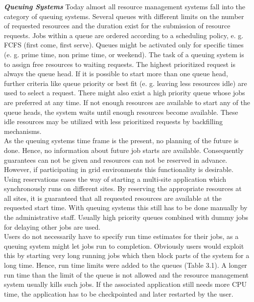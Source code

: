 \textbf{\textit{Queuing Systems }}Today almost all resource management systems fall into the category of queuing systems. Several queues with different limits on the number of requested resources and the duration exist for the submission of resource requests. Jobs within a queue are ordered according to a scheduling policy, e. g. FCFS (first come, first serve). Queues might be activated only for specific times (e. g. prime time, non prime time, or weekend). The task of a queuing system is to assign free resources to waiting requests. The highest prioritized request is always the queue head. If it is possible to start more than one queue head, further criteria like queue priority or best fit (e. g. leaving less resources idle) are used to select a request. There might also exist a high priority queue whose jobs are preferred at any time. If not enough resources are available to start any of the queue heads, the system waits until enough resources become available. These idle resources may be utilized with less prioritized requests by backfilling mechanisms.\\

As the queuing systems time frame is the present, no planning of the future is done. Hence, no information about future job starts are available. Consequently guarantees can not be given and resources can not be reserved in advance. However, if participating in grid environments this functionality is desirable. Using reservations eases the way of starting a multi-site application which synchronously runs on different sites. By reserving the appropriate resources at all sites, it is guaranteed that all requested resources are available at the requested start time. With queuing systems this still has to be done manually by the administrative staff. Usually high priority queues combined with dummy jobs for delaying other jobs are used.\\

Users do not necessarily have to specify run time estimates for their jobs, as a queuing system might let jobs run to completion. Obviously users would exploit this by starting very long running jobs which then block parts of the system for a long time. Hence, run time limits were added to the queues (Table 3.1). A longer run time than the limit of the queue is not allowed and the resource management system usually kills such jobs. If the associated application still needs more CPU time, the application has to be checkpointed and later restarted by the user.\\

